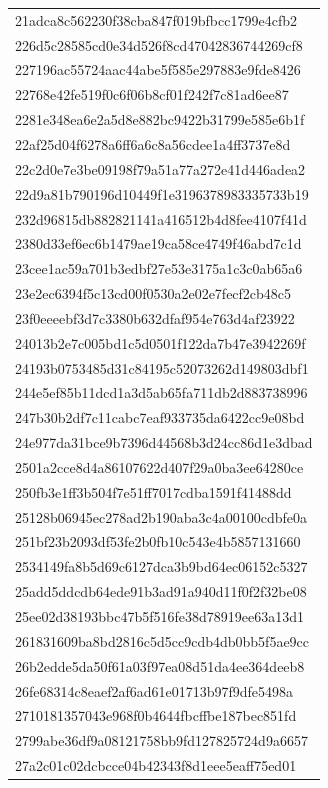 \begin{tabular}{l}
21adca8c562230f38cba847f019bfbcc1799e4cfb2 \\
226d5c28585cd0e34d526f8cd47042836744269cf8 \\
227196ac55724aac44abe5f585e297883e9fde8426 \\
22768e42fe519f0c6f06b8cf01f242f7c81ad6ee87 \\
2281e348ea6e2a5d8e882bc9422b31799e585e6b1f \\
22af25d04f6278a6ff6a6c8a56cdee1a4ff3737e8d \\
22c2d0e7e3be09198f79a51a77a272e41d446adea2 \\
22d9a81b790196d10449f1e3196378983335733b19 \\
232d96815db882821141a416512b4d8fee4107f41d \\
2380d33ef6ec6b1479ae19ca58ce4749f46abd7c1d \\
23cee1ac59a701b3edbf27e53e3175a1c3c0ab65a6 \\
23e2ec6394f5c13cd00f0530a2e02e7fecf2cb48c5 \\
23f0eeeebf3d7c3380b632dfaf954e763d4af23922 \\
24013b2e7c005bd1c5d0501f122da7b47e3942269f \\
24193b0753485d31c84195c52073262d149803dbf1 \\
244e5ef85b11dcd1a3d5ab65fa711db2d883738996 \\
247b30b2df7c11cabc7eaf933735da6422cc9e08bd \\
24e977da31bce9b7396d44568b3d24cc86d1e3dbad \\
2501a2cce8d4a86107622d407f29a0ba3ee64280ce \\
250fb3e1ff3b504f7e51ff7017cdba1591f41488dd \\
25128b06945ec278ad2b190aba3c4a00100cdbfe0a \\
251bf23b2093df53fe2b0fb10c543e4b5857131660 \\
2534149fa8b5d69c6127dca3b9bd64ec06152c5327 \\
25add5ddcdb64ede91b3ad91a940d11f0f2f32be08 \\
25ee02d38193bbc47b5f516fe38d78919ee63a13d1 \\
261831609ba8bd2816c5d5cc9cdb4db0bb5f5ae9cc \\
26b2edde5da50f61a03f97ea08d51da4ee364deeb8 \\
26fe68314c8eaef2af6ad61e01713b97f9dfe5498a \\
2710181357043e968f0b4644fbcffbe187bec851fd \\
2799abe36df9a08121758bb9fd127825724d9a6657 \\
27a2c01c02dcbcce04b42343f8d1eee5eaff75ed01 \\

\end{tabular}
